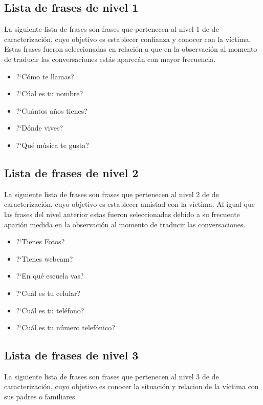 \subsection{Lista de frases de nivel 1}
La siguiente lista de frases son frases que pertenecen al nivel 1 de de caracterizaci\'on, cuyo objetivo es establecer confianza y conocer con la v\'ictima. Estas frases fueron seleccionadas en relaci\'on a que en la observaci\'on al momento de traducir las conversaciones est\'as aparec\'an con mayor frecuencia.

\begin{itemize}
\item ?`C\'omo te llamas?
\item ?`C\'ual es tu nombre?
\item ?`Cu\'antos a\~nos tienes?
\item ?`D\'onde vives?
\item ?`Qu\'e m\'usica te gusta?
\end{itemize}


\subsection{Lista de frases de nivel 2}
La siguiente lista de frases son frases que pertenecen al nivel 2 de de caracterizaci\'on, cuyo objetivo es establecer amistad con la v\'ictima. Al igual que las frases del nivel anterior estas fueron seleccionadas debido a su frecuente apari\'on medida en la observaci\'on al momento de traducir las conversaciones.


\begin{itemize}
\item ?`Tienes Fotos?
\item ?`Tienes webcam?
\item ?`En qu\'e escuela vas?
\item ?`Cu\'al es tu celular?
\item ?`Cu\'al es tu tel\'efono?
\item ?`Cu\'al es tu n\'umero telef\'onico?
\end{itemize}




\subsection{Lista de frases de nivel 3}
La siguiente lista de frases son frases que pertenecen al nivel 3 de de caracterizaci\'on, cuyo objetivo es conocer la situaci\'on y relacion de la v\'ictima con sus padres o familiares. 


